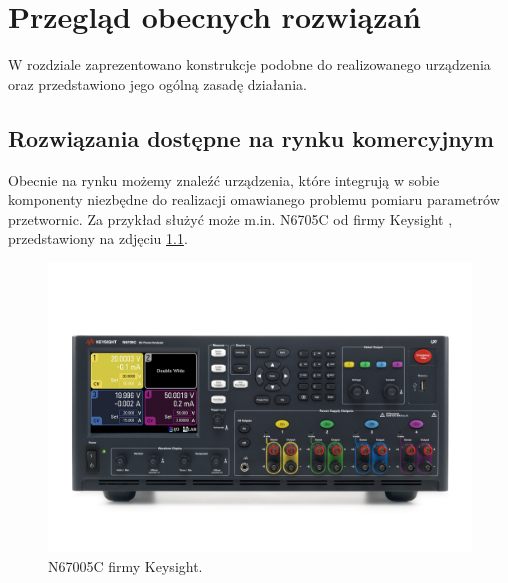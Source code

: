 \chapter{Przegląd obecnych rozwiązań}
\label{chapter-2}

W rozdziale zaprezentowano konstrukcje podobne do realizowanego urządzenia oraz przedstawiono jego ogólną zasadę działania.

\vspace{0.5cm}

\section{Rozwiązania dostępne na rynku komercyjnym}


Obecnie na rynku możemy znaleźć urządzenia, które integrują w sobie komponenty niezbędne do realizacji omawianego problemu pomiaru parametrów przetwornic.
Za przykład służyć może m.in. N6705C od firmy Keysight \cite{n6705c}, przedstawiony na zdjęciu \ref{fig:N6705C}.

\begin{figure}[h!]
    \centering
 \includegraphics[width = 15cm]{images/n6705c.png}
 \caption{N67005C firmy Keysight.}
 \label{fig:N6705C}
\end{figure}


